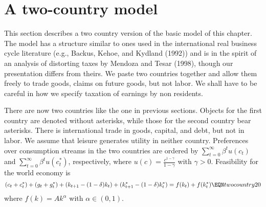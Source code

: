 \section{A two-country model}

This section describes a two country version of the basic model of this chapter. The model has a structure similar to ones used in the international real business cycle literature
(e.g., Backus, Kehoe, and Kydland (1992))  and is in the spirit of an analysis of distorting taxes by Mendoza and Tesar (1998), though our  presentation differs from theirs.
We paste two countries together and allow them freely to trade goods, claims on future goods, but not labor.  %
 We shall have to be careful in how we specify taxation of earnings by non residents. %
%
%

There are now two countries like the one in previous sections. Objects for  the first country are denoted without asterisks, while those for the second country
bear asterisks.  There is international trade in goods, capital, and debt, but not in labor.  We assume that leisure generates utility in neither
country. Preferences over consumption streams in the two countries are ordered by $\sum_{t=0}^\infty \beta^t u(c_t)$ and $\sum_{t=0}^\infty \beta^t u(c_t^*)$, respectively,
where $u(c) = {\frac{c^{1-\gamma}}{1-\gamma}}$ with $\gamma > 0$.  Feasibility
for the world economy is
$$ (c_t+c_t^*) + (g_t + g_t^*) + (k_{t+1} - (1-\delta ) k_t ) + (k_{t+1}^* - (1-\delta ) k_t^* ) = f(k_t) + f(k_t^*) \EQN twocountry20 $$
where $f(k) = A k^\alpha$ with $\alpha \in (0,1)$.

